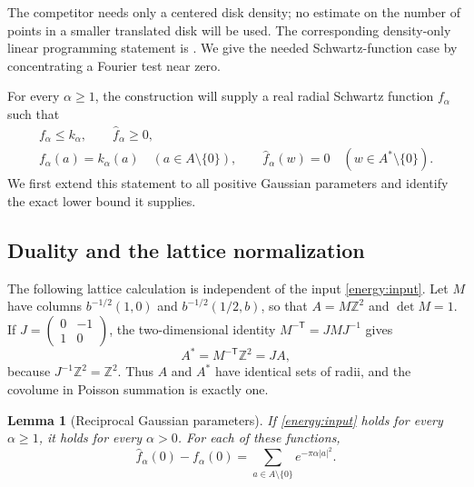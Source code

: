 \documentclass[11pt]{article}
\newtheorem{lemma}[theorem]{Lemma}
\theoremstyle{remark}\newtheorem{remark}[theorem]{Remark}
\begin{document}
The competitor needs only a centered disk density; no estimate on the
number of points in a smaller translated disk will be used. The corresponding
density-only linear programming statement is
\cite[Definition~1.1 and Proposition~2.2]{CohnDeCourcyIreland2018}.
We give the needed Schwartz-function case by concentrating a Fourier test
near zero.

For every $\alpha\ge1$, the construction will supply a real radial
Schwartz function $f_\alpha$ such that
\begin{equation}
 \begin{gathered}
 f_\alpha\le k_\alpha,\qquad \widehat f_\alpha\ge0,\\
 f_\alpha(a)=k_\alpha(a)\quad(a\in A\setminus\{0\}),\qquad
 \widehat f_\alpha(w)=0\quad(w\in A^*\setminus\{0\}).
 \end{gathered}
 \label{energy:input}
\end{equation}
We first extend this statement to all positive Gaussian parameters and
identify the exact lower bound it supplies.

\subsection{Duality and the lattice normalization}

The following lattice calculation is independent of the input
\eqref{energy:input}.
Let $M$ have columns
$b^{-1/2}(1,0)$ and $b^{-1/2}(1/2,b)$, so that
$A=M\mathbb Z^2$ and $\det M=1$.
If $J=\left(\begin{smallmatrix}0&-1\\1&0\end{smallmatrix}\right)$,
the two-dimensional identity $M^{-\mathsf T}=JMJ^{-1}$ gives
\[
 A^*=M^{-\mathsf T}\mathbb Z^2=JA,
\]
because $J^{-1}\mathbb Z^2=\mathbb Z^2$.
Thus $A$ and $A^*$ have identical sets of radii, and the covolume in
Poisson summation is exactly one.

\begin{lemma}[Reciprocal Gaussian parameters]
\label{energy:reciprocal}
If \eqref{energy:input} holds for every $\alpha\ge1$, it holds for every
$\alpha>0$. For each of these functions,
\begin{equation}
 \widehat f_\alpha(0)-f_\alpha(0)
 =\sum_{a\in A\setminus\{0\}}e^{-\pi\alpha|a|^2}.
 \label{energy:poisson}
\end{equation}
\end{lemma}
\end{document}
